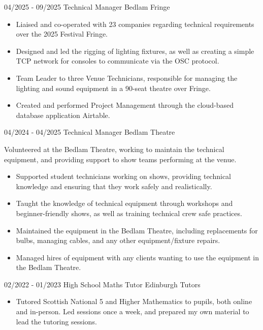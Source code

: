 \documentclass[../../cv-cs.tex]{subfiles}
\begin{document}
\cvevent
{04/2025 - 09/2025}
	{Technical Manager}
	{Bedlam Fringe}
	{\begin{itemize}
	    \item Liaised and co-operated with 23 companies regarding technical requirements over the 2025 Festival Fringe.
		\item Designed and led the rigging of lighting fixtures, as well as creating a simple TCP network for consoles to communicate via the OSC protocol.
		\item Team Leader to three Venue Technicians, responsible for managing the lighting and sound equipment in a 90-seat theatre over Fringe.
		\item Created and performed Project Management through the cloud-based database application Airtable.
	\end{itemize}}

	\vfill\null

\cvevent
{04/2024 - 04/2025}
	{Technical Manager}
	{Bedlam Theatre}
	{
		Volunteered at the Bedlam Theatre, working to maintain the technical equipment, and providing support to show teams performing at the venue.

		\begin{itemize}
			\item Supported student technicians working on shows, providing technical knowledge and ensuring that they work safely and realistically. 
			\item Taught the knowledge of technical equipment through workshops and beginner-friendly shows, as well as training technical crew safe practices. 
			\item Maintained the equipment in the Bedlam Theatre, including replacements for bulbs, managing cables, and any other equipment/fixture repairs. 
			\item Managed hires of equipment with any clients wanting to use the equipment in the Bedlam Theatre. 
	\end{itemize}
}
\vfill\null

\cvevent
{02/2022 - 01/2023}
	{High School Maths Tutor}
	{Edinburgh Tutors}
	{\begin{itemize}
	    \item Tutored Scottish National 5 and Higher Mathematics to pupils, both online and in-person. Led sessions once a week, and prepared my own material to lead the tutoring sessions.
	\end{itemize}}

	\vfill\null
\end{document}

